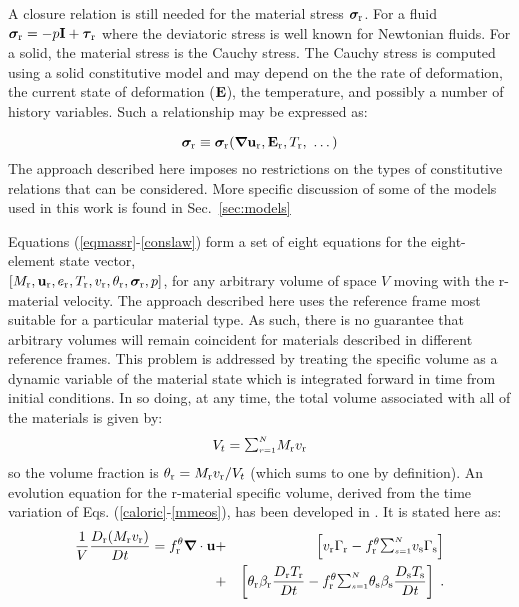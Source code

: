 A closure relation is still needed for the material stress $\sig_\rmr$.
For a fluid $\sig_\rmr = -p\bfI + \taubold_\rmr$ where the deviatoric stress
is well known for Newtonian fluids.  For a solid, the material stress is the
Cauchy stress.  The Cauchy stress is computed using a solid constitutive
model and may depend on the the rate of deformation, the current state of
deformation ($\bfE$), the temperature, and possibly a number of history
variables.  Such a relationship may be expressed as:

%
\begin{equation}
{\sig}_\rmr \equiv \sig_\rmr(\bnabla\bfu_\rmr, \bfE_\rmr, T_\rmr,~ \dots)
\label{conslaw}
\end{equation}
%
The approach described here imposes no restrictions on the types of constitutive relations
that can be considered.  More specific discussion of some of the models
used in this work is found in Sec.~\ref{sec:models}

Equations (\ref{eqmassr}-\ref{conslaw}) form a set of eight equations for
the eight-element state vector, \\ $[M_\rmr, \bfu_\rmr, e_\rmr, T_\rmr,
v_\rmr, \theta_\rmr, \sig_\rmr, p]$, for any arbitrary volume of space $V$
moving with the r-material velocity.  The approach described here uses the
reference frame most suitable for a particular material type.  As such,
there is no guarantee that arbitrary volumes will remain coincident for
materials described in different reference frames.  This problem is addressed
by treating the specific volume as a dynamic variable of the material state
which is integrated forward in time from initial conditions.  In so doing,
at any time, the total volume associated with all of the materials is given by:
%
\begin{eqnarray}
V_t = {\raise1.5pt\hbox{$\scriptstyle\sum_{r=1}^N$}} M_\rmr v_\rmr
\end{eqnarray}
%
so the volume fraction is $\theta_\rmr = M_\rmr v_\rmr / V_t$ (which sums
to one by definition).  An evolution equation for the r-material specific
volume, derived from the time variation of Eqs. (\ref{caloric}-\ref{mmeos}),
has been developed in \cite{kashiwa2000}.  It is stated here as:
%
\begin{eqnarray}
{1\over V}{D_\rmr (M_\rmr v_\rmr) \over Dt} =
f_\rmr^{\theta} \bnabla \cdot \bfu &+&
\left[v_\rmr \Gamma_\rmr -
f_\rmr^{\theta} \SUM
v_\rms \Gamma_\rms \right]  \nonumber \\ &+&
\left[\theta_\rmr
\beta_\rmr {D_\rmr T_\rmr\over Dt} -
f_\rmr^{\theta} \SUM
\theta_\rms \beta_\rms {D_\rms T_\rms\over Dt} \right] \; .
\label{eqspvolr}
\end{eqnarray}

